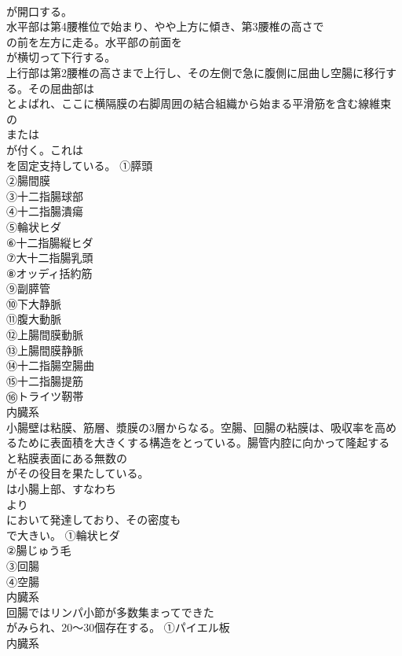 \documentclass[8pt]{extreport}
\begin{document}
\begin{CJK}{UTF8}{min}
\\	が開口する。
\\	水平部は第4腰椎位で始まり、やや上方に傾き、第3腰椎の高さで
\\	の前を左方に走る。水平部の前面を
\\	が横切って下行する。
\\	上行部は第2腰椎の高さまで上行し、その左側で急に腹側に屈曲し空腸に移行する。その屈曲部は
\\	とよばれ、ここに横隔膜の右脚周囲の結合組織から始まる平滑筋を含む線維束の
\\	または
\\	が付く。これは
\\	を固定支持している。	①膵頭
\\	②腸間膜
\\	③十二指腸球部
\\	④十二指腸潰瘍
\\	⑤輪状ヒダ
\\	⑥十二指腸縦ヒダ
\\	⑦大十二指腸乳頭
\\	⑧オッディ括約筋
\\	⑨副膵管
\\	⑩下大静脈
\\	⑪腹大動脈
\\	⑫上腸間膜動脈
\\	⑬上腸間膜静脈
\\	⑭十二指腸空腸曲
\\	⑮十二指腸提筋
\\	⑯トライツ靭帯
\\	内臓系
\\	小腸壁は粘膜、筋層、漿膜の3層からなる。空腸、回腸の粘膜は、吸収率を高めるために表面積を大きくする構造をとっている。腸管内腔に向かって隆起する
\\	と粘膜表面にある無数の
\\	がその役目を果たしている。
\\	は小腸上部、すなわち
\\	より
\\	において発達しており、その密度も
\\	で大きい。	①輪状ヒダ
\\	②腸じゅう毛
\\	③回腸
\\	④空腸
\\	内臓系
\\	回腸ではリンパ小節が多数集まってできた
\\	がみられ、20～30個存在する。	①パイエル板
\\	内臓系

\end{CJK}
\end{document}
